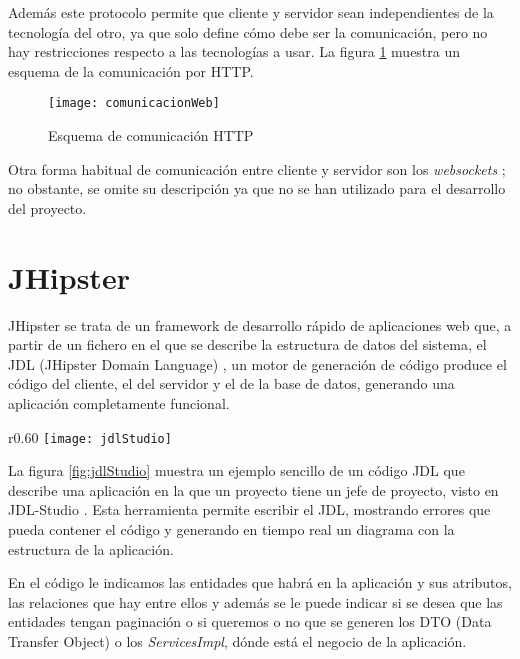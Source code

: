 Además este protocolo permite que cliente y servidor sean independientes de la tecnología del otro, ya que solo define cómo debe ser la comunicación, pero no hay restricciones respecto a las tecnologías a usar. La figura \ref{fig:comunicacionWeb} muestra un esquema de la comunicación por HTTP.

\begin{figure}[!h]
\begin{center}
\texttt{[image: comunicacionWeb]}
\caption{Esquema de comunicación HTTP}
\label{fig:comunicacionWeb}
\end{center}
\end{figure} 

Otra forma habitual de comunicación entre cliente y servidor son los \emph{websockets} \cite{websockets}; no obstante, se omite su descripción ya que no se han utilizado para el desarrollo del proyecto.

\section{JHipster}
\label{sec:JHipster}

JHipster se trata de un framework de desarrollo rápido de aplicaciones web que, a partir de un fichero en el que se describe la estructura de datos del sistema, el JDL (JHipster Domain Language) \cite{jdl}, un motor de generación de código produce el código del cliente, el del servidor y el de la base de datos, generando una aplicación completamente funcional. 

\begin{wrapfigure}{r}{0.60\textwidth} %
    \centering
    \texttt{[image: jdlStudio]}
    \caption{Ejemplo de JDL}
    \label{fig:jdlStudio}
\end{wrapfigure}

La figura \ref{fig:jdlStudio} muestra un ejemplo sencillo de un código JDL que describe una aplicación en la que un proyecto tiene un jefe de proyecto, visto en JDL-Studio \cite{jdl-studio}. Esta herramienta permite escribir el JDL, mostrando errores que pueda contener el código y generando en tiempo real un diagrama con la estructura de la aplicación. 

En el código le indicamos las entidades que habrá en la aplicación y sus atributos, las relaciones que hay entre ellos y además se le puede indicar si se desea que las entidades tengan paginación o si queremos o no que se generen los DTO (Data Transfer Object) o los \emph{ServicesImpl}, dónde está el negocio de la aplicación.


